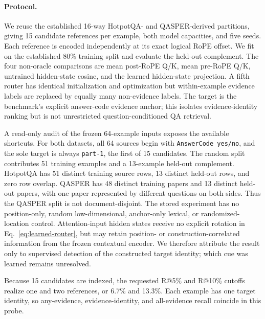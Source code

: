 \documentclass[11pt]{article}
\begin{document}
\paragraph{Protocol.}
We reuse the established 16-way HotpotQA- and QASPER-derived partitions, giving 15 candidate
references per example, both model capacities, and five seeds. Each reference is encoded
independently at its exact logical RoPE offset. We fit on the established 80\% training split
and evaluate the held-out complement. The four non-oracle comparisons are mean post-RoPE Q/K,
mean pre-RoPE Q/K, untrained hidden-state cosine, and the learned hidden-state projection. A
fifth router has identical initialization and optimization but within-example evidence labels
are replaced by equally many non-evidence labels. The target is the benchmark's explicit
answer-code evidence anchor; this isolates evidence-identity ranking but is not unrestricted
question-conditioned QA retrieval.

A read-only audit of the frozen 64-example inputs exposes the available shortcuts. For both
datasets, all 64 sources begin with \texttt{AnswerCode yes/no}, and the sole target is
always \texttt{part-1}, the first of 15 candidates. The random split contributes 51 training
examples and a 13-example held-out complement. HotpotQA has 51 distinct training source rows,
13 distinct held-out rows, and zero row overlap. QASPER has 48 distinct training papers and 13
distinct held-out papers, with one paper represented by different questions on both sides.
Thus the QASPER split is not document-disjoint. The stored experiment has no position-only,
random low-dimensional, anchor-only lexical, or randomized-location control. Attention-input
hidden states receive no explicit rotation in Eq.~\ref{eq:learned-router}, but may retain
position- or construction-correlated information from the frozen contextual encoder. We
therefore attribute the result only to supervised detection of the constructed target identity;
which cue was learned remains unresolved.

Because 15 candidates are indexed, the requested R@5\% and R@10\% cutoffs realize one and two
references, or 6.7\% and 13.3\%. Each example has one target identity, so any-evidence,
evidence-identity, and all-evidence recall coincide in this probe.
\end{document}
